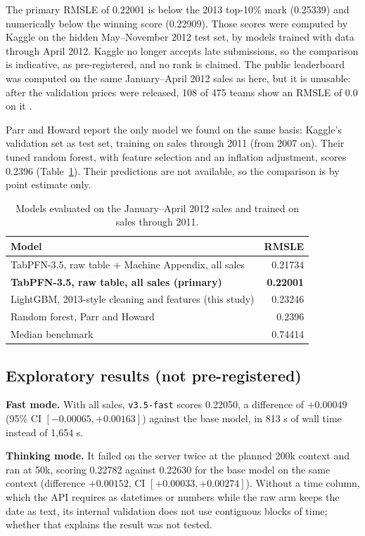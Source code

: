 \documentclass[11pt,a4paper]{article}
\begin{document}
The primary RMSLE of 0.22001 is below the 2013 top-10\% mark (0.25339) and numerically below the winning score (0.22909). Those scores were computed by Kaggle on the hidden May--November 2012 test set, by models trained with data through April 2012. Kaggle no longer accepts late submissions, so the comparison is indicative, as pre-registered, and no rank is claimed. The public leaderboard was computed on the same January--April 2012 sales as here, but it is unusable: after the validation prices were released, 108 of 475 teams show an RMSLE of 0.0 on it \cite{parr}.

Parr and Howard \cite{parr} report the only model we found on the same basis: Kaggle's validation set as test set, training on sales through 2011 (from 2007 on). Their tuned random forest, with feature selection and an inflation adjustment, scores 0.2396 (Table~\ref{tab:external}). Their predictions are not available, so the comparison is by point estimate only.

\begin{table}[H]
\centering\small
\caption{Models evaluated on the January--April 2012 sales and trained on sales through 2011.}
\label{tab:external}
\begin{tabular}{lr}
\toprule
Model & RMSLE \\
\midrule
TabPFN-3.5, raw table + Machine Appendix, all sales & 0.21734 \\
\textbf{TabPFN-3.5, raw table, all sales (primary)} & \textbf{0.22001} \\
LightGBM, 2013-style cleaning and features (this study) & 0.23246 \\
Random forest, Parr and Howard \cite{parr} & 0.2396 \\
Median benchmark & 0.74414 \\
\bottomrule
\end{tabular}
\end{table}

\subsection{Exploratory results (not pre-registered)}

\textbf{Fast mode.} With all sales, \texttt{v3.5-fast} scores 0.22050, a difference of $+0.00049$ (95\% CI $[-0.00065, +0.00163]$) against the base model, in 813 s of wall time instead of 1,654 s.

\textbf{Thinking mode.} It failed on the server twice at the planned 200k context and ran at 50k, scoring 0.22782 against 0.22630 for the base model on the same context (difference $+0.00152$, CI $[+0.00033, +0.00274]$). Without a time column, which the API requires as datetimes or numbers while the raw arm keeps the date as text, its internal validation does not use contiguous blocks of time; whether that explains the result was not tested.
\end{document}
